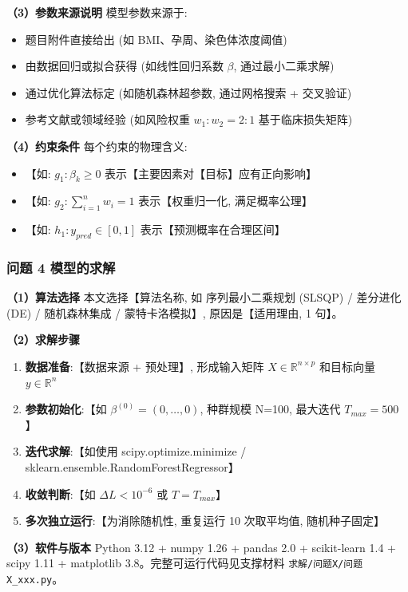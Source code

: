 \textbf{（3）参数来源说明} \quad 模型参数来源于:
\begin{itemize}
  \item 题目附件直接给出 (如 BMI、孕周、染色体浓度阈值)
  \item 由数据回归或拟合获得 (如线性回归系数 $\beta$, 通过最小二乘求解)
  \item 通过优化算法标定 (如随机森林超参数, 通过网格搜索 + 交叉验证)
  \item 参考文献或领域经验 (如风险权重 $w_1:w_2 = 2:1$ 基于临床损失矩阵)
\end{itemize}

\textbf{（4）约束条件} \quad 每个约束的物理含义:
\begin{itemize}
  \item 【如: $g_1: \beta_k \geq 0$ 表示【主要因素对【目标】应有正向影响】
  \item 【如: $g_2: \sum_{i=1}^{n} w_i = 1$ 表示【权重归一化, 满足概率公理】
  \item 【如: $h_1: y_{pred} \in [0,1]$ 表示【预测概率在合理区间】
\end{itemize}

\subsubsection{问题 4 模型的求解}

\textbf{（1）算法选择} \quad 本文选择【算法名称, 如 序列最小二乘规划 (SLSQP) / 差分进化 (DE) / 随机森林集成 / 蒙特卡洛模拟】, 原因是【适用理由, 1 句】。

\textbf{（2）求解步骤}
\begin{enumerate}
  \item \textbf{数据准备}:【数据来源 + 预处理】, 形成输入矩阵 $X \in \mathbb{R}^{n \times p}$ 和目标向量 $y \in \mathbb{R}^n$
  \item \textbf{参数初始化}:【如 $\beta^{(0)} = (0,\ldots,0)$, 种群规模 N=100, 最大迭代 $T_{max}=500$】
  \item \textbf{迭代求解}:【如使用 scipy.optimize.minimize / sklearn.ensemble.RandomForestRegressor】
  \item \textbf{收敛判断}:【如 $\Delta L < 10^{-6}$ 或 $T = T_{max}$】
  \item \textbf{多次独立运行}:【为消除随机性, 重复运行 10 次取平均值, 随机种子固定】
\end{enumerate}

\textbf{（3）软件与版本} \quad Python 3.12 + numpy 1.26 + pandas 2.0 + scikit-learn 1.4 + scipy 1.11 + matplotlib 3.8。完整可运行代码见支撑材料 \texttt{求解/问题X/问题X\_xxx.py}。

